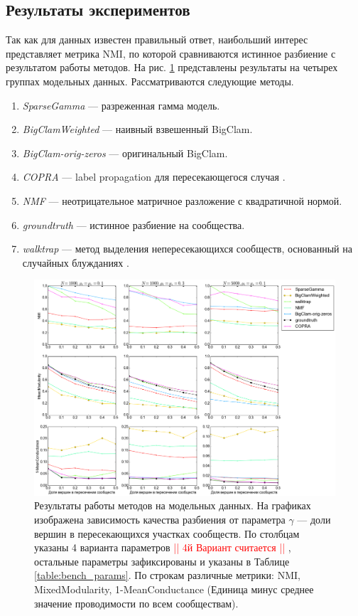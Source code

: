 \documentclass{ITaSconf}
\newcommand\note[1]{ \textcolor{red}{|| #1 ||} }
\begin{document}
\subsection{Результаты экспериментов}

Так как для данных известен правильный ответ, наибольший интерес представляет метрика NMI, по которой сравниваются истинное разбиение с результатом работы методов. На рис. \ref{fig:experiments} представлены результаты на четырех группах модельных данных.
Рассматриваются следующие методы.

\begin{enumerate}
	\item \textit{SparseGamma} --- разреженная гамма модель.
	\item \textit{BigClamWeighted} --- наивный взвешенный BigClam.
	\item \textit{BigClam-orig-zeros} --- оригинальный BigClam.
	\item \textit{COPRA} --- label propagation для пересекающегося случая \cite{gregory2010finding}.
	\item \textit{NMF} --- неотрицательное матричное разложение с квадратичной нормой.
	\item \textit{groundtruth} --- истинное разбиение на сообщества.
	\item \textit{walktrap} --- метод выделения непересекающихся сообществ, основанный на случайных блужданиях \cite{Pascal05}.
\end{enumerate}

\begin{figure}[!h]
	\centering
	\includegraphics[width=\textwidth]{imgs/experiments_all.png}
	\caption{Результаты работы методов на модельных данных. На графиках изображена зависимость качества разбиения от параметра $\gamma$ --- доли вершин в пересекающихся участках сообществ. По столбцам указаны 4 варианта параметров \note{4й Вариант считается}, остальные параметры зафиксированы и указаны в Таблице \ref{table:bench_params}. По строкам различные метрики: NMI, MixedModularity, 1-MeanConductance (Единица минус среднее значение проводимости по всем сообществам).}
	\label{fig:experiments}
\end{figure}
\end{document}

